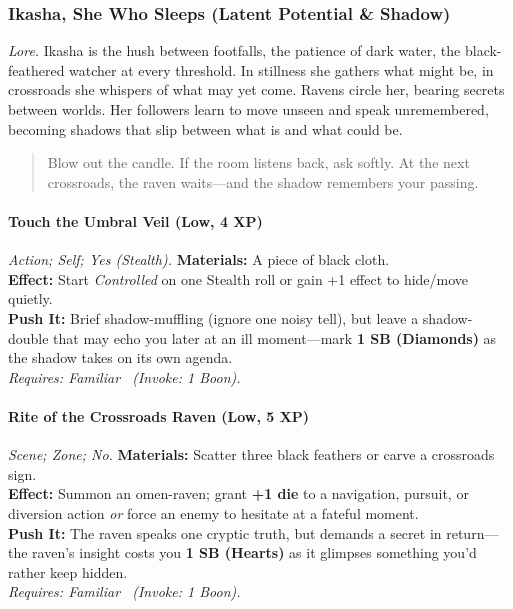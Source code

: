 \subsubsection{Ikasha, She Who Sleeps (Latent Potential \& Shadow)}
\textit{Lore.} Ikasha is the hush between footfalls, the patience of dark water, the black-feathered watcher at every threshold. In stillness she gathers what might be, in crossroads she whispers of what may yet come. Ravens circle her, bearing secrets between worlds. Her followers learn to move unseen and speak unremembered, becoming shadows that slip between what is and what could be.

\begin{quote}
Blow out the candle. If the room listens back, ask softly. At the next crossroads, the raven waits—and the shadow remembers your passing.
\end{quote}

\paragraph{Touch the Umbral Veil (Low, 4 XP)} \emph{Action; Self; Yes (Stealth).}
\textbf{Materials:} A piece of black cloth.\\
\textbf{Effect:} Start \emph{Controlled} on one Stealth roll or gain +1 effect to hide/move quietly.\\
\textbf{Push It:} Brief shadow-muffling (ignore one noisy tell), but leave a shadow-double that may echo you later at an ill moment—mark \textbf{1 SB (Diamonds)} as the shadow takes on its own agenda.\\
\emph{Requires: Familiar \ (\textit{Invoke:} 1 Boon).}

\paragraph{Rite of the Crossroads Raven (Low, 5 XP)} \emph{Scene; Zone; No.}
\textbf{Materials:} Scatter three black feathers or carve a crossroads sign.\\
\textbf{Effect:} Summon an omen-raven; grant \textbf{+1 die} to a navigation, pursuit, or diversion action \emph{or} force an enemy to hesitate at a fateful moment.\\
\textbf{Push It:} The raven speaks one cryptic truth, but demands a secret in return—the raven's insight costs you \textbf{1 SB (Hearts)} as it glimpses something you'd rather keep hidden.\\
\emph{Requires: Familiar \ (\textit{Invoke:} 1 Boon).}

